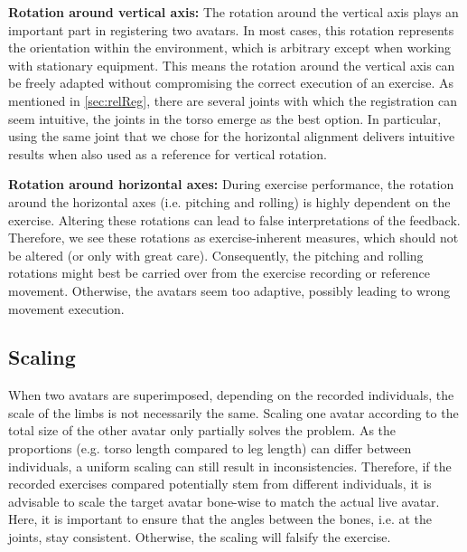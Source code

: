 \textbf{Rotation around vertical axis:}
The rotation around the vertical axis plays an important part in registering two avatars. In most cases, this rotation represents the orientation within the environment, which is arbitrary except when working with stationary equipment. This means the rotation around the vertical axis can be freely adapted without compromising the correct execution of an exercise. As mentioned in \autoref{sec:relReg}, there are several joints with which the registration can seem intuitive, the joints in the torso emerge as the best option. In particular, using the same joint that we chose for the horizontal alignment delivers intuitive results when also used as a reference for vertical rotation.

\textbf{Rotation around horizontal axes:}
During exercise performance, the rotation around the horizontal axes (i.e. pitching and rolling) is highly dependent on the exercise. Altering these rotations can lead to false interpretations of the feedback. Therefore, we see these rotations as exercise-inherent measures, which should not be altered (or only with great care). Consequently, the pitching and rolling rotations might best be carried over from the exercise recording or reference movement. Otherwise, the avatars seem too adaptive, possibly leading to wrong movement execution.

\subsection*{Scaling}
When two avatars are superimposed, depending on the recorded individuals, the scale of the limbs is not necessarily the same. Scaling one avatar according to the total size of the other avatar only partially solves the problem. As the proportions (e.g. torso length compared to leg length) can differ between individuals, a uniform scaling can still result in inconsistencies. Therefore, if the recorded exercises compared potentially stem from different individuals, it is advisable to scale the target avatar bone-wise to match the actual live avatar. Here, it is important to ensure that the angles between the bones, i.e. at the joints,  stay consistent. Otherwise, the scaling will falsify the exercise. 

